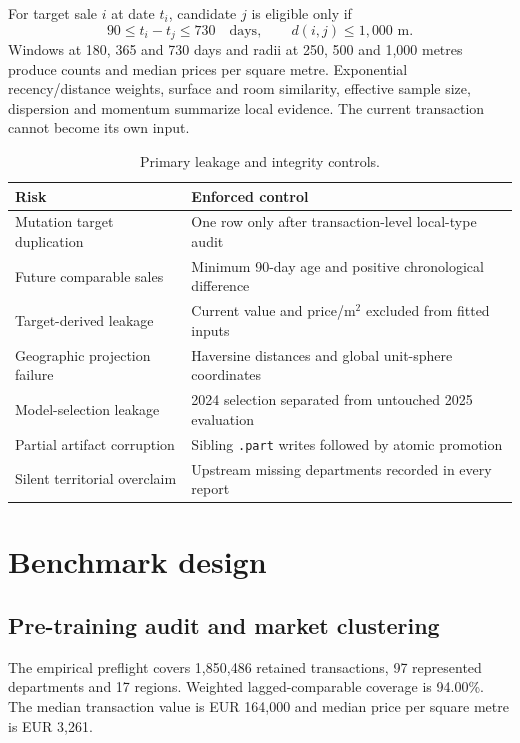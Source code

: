 \documentclass[11pt,a4paper]{article}
\begin{document}
For target sale $i$ at date $t_i$, candidate $j$ is eligible only if
\begin{equation}
90 \le t_i-t_j \le 730\quad\text{days},\qquad d(i,j)\le1{,}000\text{ m}.
\end{equation}
Windows at 180, 365 and 730 days and radii at 250, 500 and 1,000 metres produce
counts and median prices per square metre. Exponential recency/distance weights,
surface and room similarity, effective sample size, dispersion and momentum
summarize local evidence. The current transaction cannot become its own input.

\begin{table}[H]
\centering
\caption{Primary leakage and integrity controls.}
\begin{tabularx}{\textwidth}{p{4.4cm}X}
\toprule
Risk & Enforced control \\
\midrule
Mutation target duplication & One row only after transaction-level local-type audit \\
Future comparable sales & Minimum 90-day age and positive chronological difference \\
Target-derived leakage & Current value and price/m$^2$ excluded from fitted inputs \\
Geographic projection failure & Haversine distances and global unit-sphere coordinates \\
Model-selection leakage & 2024 selection separated from untouched 2025 evaluation \\
Partial artifact corruption & Sibling \texttt{.part} writes followed by atomic promotion \\
Silent territorial overclaim & Upstream missing departments recorded in every report \\
\bottomrule
\end{tabularx}
\end{table}

\section{Benchmark design}

\subsection{Pre-training audit and market clustering}


The empirical preflight covers 1,850,486 retained transactions,
97 represented departments and 17
regions. Weighted lagged-comparable coverage is
94.00\%. The median transaction value is
EUR 164,000 and median price per square
metre is EUR 3,261.
\end{document}
